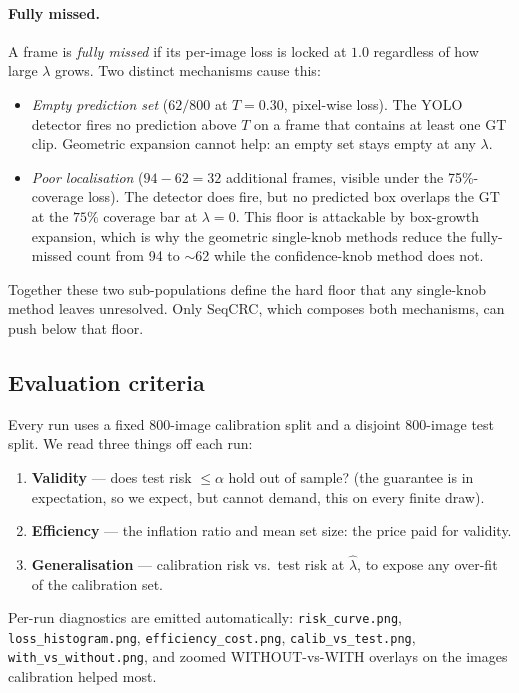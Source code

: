 \documentclass[11pt,a4paper]{article}
\newcommand{\lamhat}{\hat{\lambda}}
\newcommand{\code}[1]{\texttt{\small #1}}
\begin{document}
\paragraph{Fully missed.} A frame is \emph{fully missed} if its per-image loss
is locked at $1.0$ regardless of how large $\lambda$ grows. Two distinct
mechanisms cause this:
\begin{itemize}[nosep]
  \item \emph{Empty prediction set} ($62/800$ at $T{=}0.30$, pixel-wise loss).
    The YOLO detector fires no prediction above $T$ on a frame that contains at
    least one GT clip. Geometric expansion cannot help: an empty set stays empty
    at any $\lambda$.
  \item \emph{Poor localisation} ($94{-}62 = 32$ additional frames, visible
    under the 75\%-coverage loss). The detector does fire, but no predicted box
    overlaps the GT at the $75\%$ coverage bar at $\lambda = 0$. This floor is
    attackable by box-growth expansion, which is why the geometric single-knob
    methods reduce the fully-missed count from 94 to $\sim$62 while the
    confidence-knob method does not.
\end{itemize}
Together these two sub-populations define the hard floor that any single-knob
method leaves unresolved. Only SeqCRC, which composes both mechanisms, can push
below that floor.

\subsection{Evaluation criteria}

Every run uses a fixed $800$-image calibration split and a disjoint $800$-image
test split. We read three things off each run:
\begin{enumerate}[leftmargin=1.6cm,nosep]
  \item \textbf{Validity} --- does test risk $\le\alpha$ hold out of sample?
    (the guarantee is in expectation, so we expect, but cannot demand, this on
    every finite draw).
  \item \textbf{Efficiency} --- the inflation ratio and mean set size: the price
    paid for validity.
  \item \textbf{Generalisation} --- calibration risk vs.\ test risk at $\lamhat$,
    to expose any over-fit of the calibration set.
\end{enumerate}
Per-run diagnostics are emitted automatically: \code{risk\_curve.png},
\code{loss\_histogram.png}, \code{efficiency\_cost.png},
\code{calib\_vs\_test.png}, \code{with\_vs\_without.png}, and zoomed
WITHOUT-vs-WITH overlays on the images calibration helped most.
\end{document}
